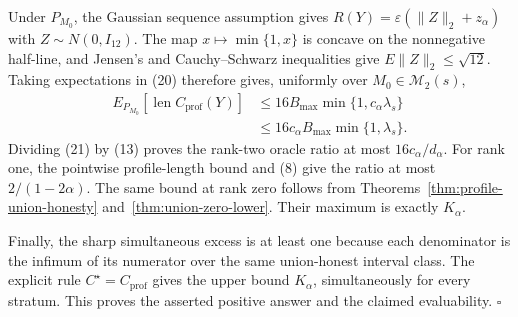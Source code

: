 Under \(P_{M_0}\), the Gaussian sequence assumption gives
\(R(Y)=\varepsilon(\lVert Z\rVert_2+z_\alpha)\) with \(Z\sim N(0,I_{12})\).  The map \(x\mapsto\min\{1,x\}\) is concave on the nonnegative half-line, and Jensen's and Cauchy--Schwarz inequalities give \(E\lVert Z\rVert_2\leq\sqrt{12}\).  Taking expectations in (20) therefore gives, uniformly over \(M_0\in\mathcal M_2(s)\),
\[
 \begin{split}
 E_{P_{M_0}}[\operatorname{len}C_{\mathrm{prof}}(Y)]
 &\leq16B_{\max}\min\{1,c_\alpha\lambda_s\}\\
 &\leq16c_\alpha B_{\max}\min\{1,\lambda_s\}.
 \end{split}
\tag{21}
\]
Dividing (21) by (13) proves the rank-two oracle ratio at most
\(16c_\alpha/d_\alpha\).  For rank one, the pointwise profile-length bound and (8) give the ratio at most \(2/(1-2\alpha)\).  The same bound at rank zero follows from Theorems~\ref{thm:profile-union-honesty} and~\ref{thm:union-zero-lower}.  Their maximum is exactly \(K_\alpha\).

Finally, the sharp simultaneous excess is at least one because each denominator is the infimum of its numerator over the same union-honest interval class.  The explicit rule \(C^\star=C_{\mathrm{prof}}\) gives the upper bound \(K_\alpha\), simultaneously for every stratum.  This proves the asserted positive answer and the claimed evaluability. \(\square\)